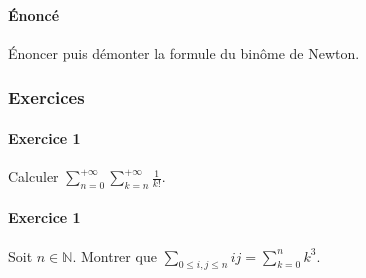 \documentclass[10pt]{article}
\def\N{\mathbb N}
\begin{document}
    \paragraph{Énoncé} Énoncer puis démonter la formule du binôme de Newton.

    \subsubsection*{Exercices}
    \paragraph{Exercice 1} Calculer \(\sum_{n=0}^{+\infty}\sum_{k=n}^{+\infty}\frac1{k!}\).

    \paragraph{Exercice 1} Soit $n\in\N$. Montrer que \(\sum_{0\leq i,j \leq n}ij=\sum_{k=0}^nk^3\).
\end{document}

